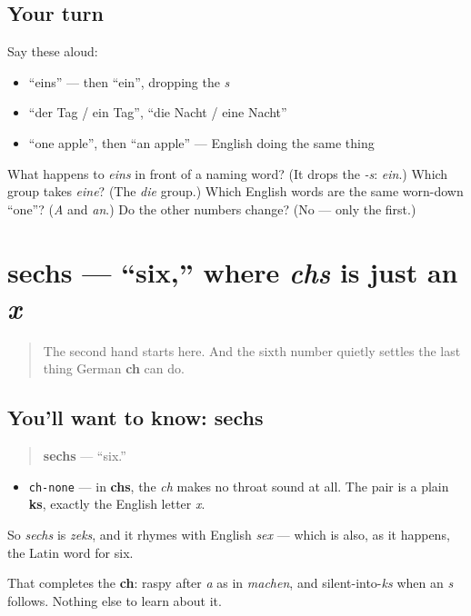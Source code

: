 \subsection*{Your turn}
Say these aloud:

\begin{itemize}
\raggedright
  \item \textquotedblleft{}eins\textquotedblright{} — then \textquotedblleft{}ein\textquotedblright{}, dropping the \emph{s}
  \item \textquotedblleft{}der Tag / ein Tag\textquotedblright{}, \textquotedblleft{}die Nacht / eine Nacht\textquotedblright{}
  \item \textquotedblleft{}one apple\textquotedblright{}, then \textquotedblleft{}an apple\textquotedblright{} — English doing the same thing
\end{itemize}

\begin{tcolorbox}[breakable,colback=teal!4,colframe=teal!35!black,title={Before you move on}]
What happens to \emph{eins} in front of a naming word? (It drops the \emph{-s}: \emph{ein}.) Which group takes \emph{eine}? (The \emph{die} group.) Which English words are the same worn-down \textquotedblleft{}one\textquotedblright{}? (\emph{A} and \emph{an}.) Do the other numbers change? (No — only the first.)
\end{tcolorbox}
\section[sechs]{sechs — \textquotedblleft{}six,\textquotedblright{} where \emph{chs} is just an \emph{x}}

\label{lesson:GE-C06-sechs}



\begin{quote}
The second hand starts here. And the sixth number quietly settles the last thing German \textbf{ch} can do.
\end{quote}

\subsection*{You'll want to know: sechs}
\begin{quote}
\textbf{sechs} — \textquotedblleft{}six.\textquotedblright{}
\end{quote}

\begin{sounds}
\begin{itemize}
\raggedright
  \item \texttt{ch-none} — in \textbf{chs}, the \emph{ch} makes no throat sound at all. The pair is a plain \textbf{ks}, exactly the English letter \emph{x}.
\end{itemize}

So \emph{sechs} is \emph{zeks}, and it rhymes with English \emph{sex} — which is also, as it happens, the Latin word for six.

That completes the \textbf{ch}: raspy after \emph{a} as in \emph{machen}, and silent-into-\emph{ks} when an \emph{s} follows. Nothing else to learn about it.
\end{sounds}

